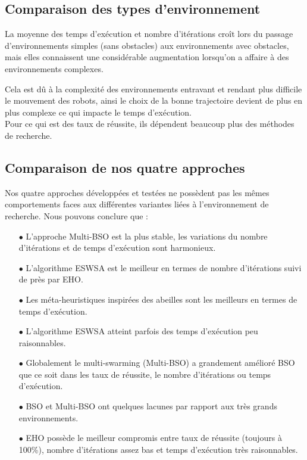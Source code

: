	
	\subsection{Comparaison des types d'environnement}
	La moyenne des temps d'exécution et nombre d'itérations croît lors du passage d'environnements simples (sans obstacles) aux environnements avec obstacles, mais elles connaissent une considérable augmentation lorsqu'on a affaire à des environnements complexes.
	
	Cela est dû à la complexité des environnements entravant et rendant plus difficile le mouvement des robots, ainsi le choix de la bonne trajectoire devient de plus en plus complexe ce qui impacte le temps d'exécution.\\
	Pour ce qui est des taux de réussite, ils dépendent beaucoup plus des méthodes de recherche.
	
	\subsection{Comparaison de nos quatre approches}
	Nos quatre approches développées et testées ne possèdent pas les mêmes comportements faces aux différentes variantes liées à l'environnement de recherche. Nous pouvons conclure que :
	\begin{itemize}
		\item[$\bullet$] L'approche Multi-BSO est la plus stable, les variations du nombre d'itérations et de temps d'exécution sont harmonieux.
		
		
		\item[$\bullet$] L'algorithme ESWSA est le meilleur en termes de nombre d'itérations suivi de près par EHO. 
		
		\item[$\bullet$] Les méta-heuristiques inspirées des abeilles sont les meilleurs en termes de temps d'exécution.
		
		\item[$\bullet$] L'algorithme ESWSA atteint parfois des temps d'exécution peu raisonnables.
		
		\item[$\bullet$] Globalement le multi-swarming (Multi-BSO) a grandement amélioré BSO que ce soit dans les taux de réussite, le nombre d'itérations ou temps d'exécution. 
		
		\item[$\bullet$] BSO et Multi-BSO ont quelques lacunes par rapport aux très grands environnements.
		
		\item[$\bullet$] EHO possède le meilleur compromis entre taux de réussite (toujours à 100\%), nombre d'itérations assez bas et temps d'exécution très raisonnables.
		
	\end{itemize}
	

